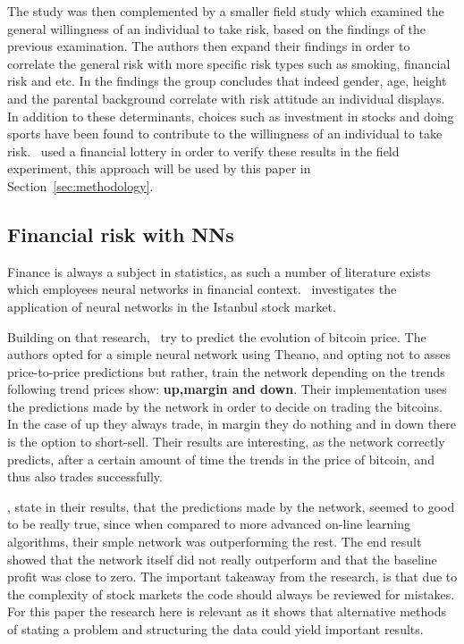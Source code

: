 \documentclass[12pt]{article}
\begin{document}
The study was then complemented by a smaller field study which examined the general willingness of an individual to take risk, based on the findings of the previous examination. The authors then expand their findings in order to correlate the general risk with more specific risk types such as smoking, financial risk and etc. In the findings the group concludes that indeed gender, age, height and the parental background correlate with risk attitude an individual displays. In addition to these determinants, choices such as investment in stocks and doing sports have been found to contribute to the willingness of an individual to take risk.~\cite{individualRiskAttitudes} used a financial lottery in order to verify these results in the field experiment, this approach will be used by this paper in Section~\ref{sec:methodology}.


\subsection{Financial risk with NNs}
\label{sub:financial_risk_nn}
Finance is always a subject in statistics, as such a number of literature exists which employees neural networks in financial context.~\cite{instanbulStock} investigates the application of neural networks in the Istanbul stock market. 

Building on that research,~\cite{bitcoinNN} try to predict the evolution of bitcoin price. The authors opted for a simple neural network using Theano, and opting not to asses price-to-price predictions but rather, train the network depending on the trends following trend prices show: \textbf{up,margin and down}. Their implementation uses the predictions made by the network in order to decide on trading the bitcoins. In the case of up they always trade, in margin they do nothing and in down there is the option to short-sell. Their results are interesting, as the network correctly predicts, after a certain amount of time the trends in the price of bitcoin, and thus also trades successfully.

\cite{bitoinNN}, state in their results, that the predictions made by the network, seemed to good to be really true, since when compared to more advanced on-line learning algorithms, their smple network was outperforming the rest. The end result showed that the network itself did not really outperform and that the baseline profit was close to zero. The important takeaway from the research, is that due to the complexity of stock markets the code should always be reviewed for mistakes. For this paper the research here is relevant as it shows that alternative methods of stating a problem and structuring the data could yield important results.
\end{document}
